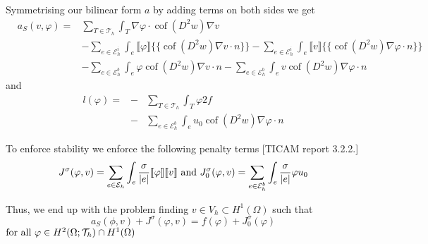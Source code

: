 \documentclass[a4paper,11pt]{article}
\newcommand{\myint}{\displaystyle\int}
\newcommand{\cof}{\operatorname{cof}}
\newcommand{\edges}{\mathcal{E}_h}
\newcommand{\edgesi}{\mathcal{E}_h^i}
\newcommand{\edgesb}{\mathcal{E}_h^b}
\newcommand{\triang}{\mathcal{T}_h}
\begin{document}
Symmetrising our bilinear form $a$ by adding terms on both sides we get
\begin{eqnarray*}
 &a_S(v, \varphi) = &\sum\limits_{T \in \triang} \myint_T \nabla \varphi \cdot \cof(D^2 w) \nabla v \\
 & &-\sum\limits_{e \in \edgesi}\myint_{e} \llbracket\varphi\rrbracket \{\{ \cof(D^2 w) \nabla v \cdot n \}\} 
 - \sum\limits_{e \in \edgesi}\myint_{e} \llbracket v\rrbracket \{\{ \cof(D^2 w) \nabla \varphi \cdot n \}\} \\  
 && - \sum\limits_{e \in \edgesb}\myint_{e} \varphi \cof(D^2 w) \nabla v \cdot n 
    - \sum\limits_{e \in \edgesb}\myint_{e} v \cof(D^2 w) \nabla \varphi \cdot n
\end{eqnarray*}
and 
\begin{eqnarray*}
	l(\varphi) = &-& \sum\limits_{T \in \triang} \myint_T \varphi 2f \\
	 				&-&\sum\limits_{e \in \edgesb}\myint_{e} u_0 \cof(D^2 w) \nabla \varphi \cdot n 
\end{eqnarray*} 


To enforce stability we enforce the following penalty terms [TICAM report 3.2.2.]
\begin{eqnarray*}
	J^\sigma(\varphi, v) = \sum\limits_{e \in \edges} \myint_e \frac \sigma {|e|} \llbracket \varphi \rrbracket \llbracket v \rrbracket \textnormal{ and } 	J^\sigma_0(\varphi, v) = \sum\limits_{e \in \edgesb} \myint_e \frac \sigma {|e|} \varphi u_0  
\end{eqnarray*}

Thus, we end up with the problem finding $v \in V_h \subset H^1(\Omega)$ such that
\[
	a_S(\phi,v) + J^\sigma(\varphi,v) = f(\varphi) + J^\sigma_0(\varphi)
\] 
$  \textnormal{for all } \varphi \in H^2(\Omega; \triang) \cap H^1(\Omega)$
\end{document}
